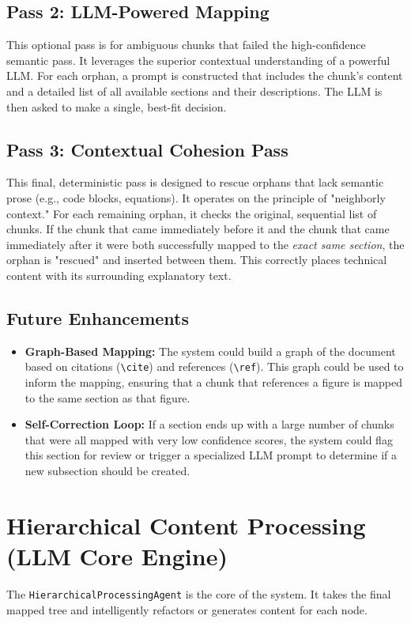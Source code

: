 \documentclass{article}
\begin{document}
\subsection{Pass 2: LLM-Powered Mapping}
This optional pass is for ambiguous chunks that failed the high-confidence semantic pass. It leverages the superior contextual understanding of a powerful LLM. For each orphan, a prompt is constructed that includes the chunk's content and a detailed list of all available sections and their descriptions. The LLM is then asked to make a single, best-fit decision.

\subsection{Pass 3: Contextual Cohesion Pass}
This final, deterministic pass is designed to rescue orphans that lack semantic prose (e.g., code blocks, equations). It operates on the principle of "neighborly context." For each remaining orphan, it checks the original, sequential list of chunks. If the chunk that came immediately before it and the chunk that came immediately after it were both successfully mapped to the \textit{exact same section}, the orphan is "rescued" and inserted between them. This correctly places technical content with its surrounding explanatory text.

\subsection{Future Enhancements}
\begin{itemize}
    \item \textbf{Graph-Based Mapping:} The system could build a graph of the document based on citations (\texttt{\textbackslash cite}) and references (\texttt{\textbackslash ref}). This graph could be used to inform the mapping, ensuring that a chunk that references a figure is mapped to the same section as that figure.
    \item \textbf{Self-Correction Loop:} If a section ends up with a large number of chunks that were all mapped with very low confidence scores, the system could flag this section for review or trigger a specialized LLM prompt to determine if a new subsection should be created.
\end{itemize}

\section{Hierarchical Content Processing (LLM Core Engine)}
The \texttt{HierarchicalProcessingAgent} is the core of the system. It takes the final mapped tree and intelligently refactors or generates content for each node.
\end{document}
